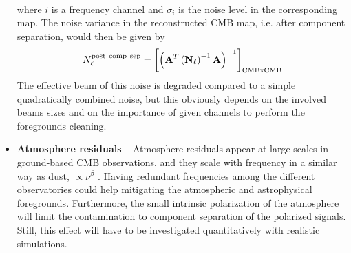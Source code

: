 \begin{itemize}
\begin{eqnarray}
	\end{eqnarray}
	where $i$ is a frequency channel and $\sigma_i$ is the noise level in the corresponding map. The noise variance in the reconstructed CMB map, i.e. after component separation, would then be given by
	\begin{eqnarray}
		\centering
			N_\ell^{\rm post\ comp\ sep} = \left[\left(\mathbf{A}^T\left(\mathbf{N}_\ell\right)^{-1}\mathbf{A}\right)^{-1}\right]_{\rm CMBxCMB}
	\end{eqnarray}
	The effective beam of this noise is degraded compared to a simple quadratically combined noise, but this obviously depends on the involved beams sizes and on the importance of given channels to perform the foregrounds cleaning.
	\item \textbf{Atmosphere residuals} -- Atmosphere residuals appear at large scales in ground-based CMB observations, and they scale with frequency in a similar way as dust, $\propto \nu^\beta$ \cite{errard15a}. Having redundant frequencies among the different observatories could help mitigating the atmospheric and astrophysical foregrounds. Furthermore, the small intrinsic polarization of the atmosphere \cite{battistelli12,errard15a} will
limit the contamination to component separation of the polarized signals.
Still, this effect will have to be investigated quantitatively with realistic simulations.
\end{itemize}




%

